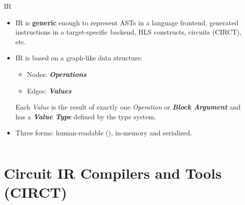\documentclass[8pt,a4paper,oneside,hidelinks,aspectratio=169,dvipsnames]{beamer}
\newcommand{\code}[1]{\texttt{\detokenize{#1}}}
\begin{document}
\begin{frame}{ IR}
  \begin{itemize}
    \item IR is \textbf{generic} enough to represent ASTs in a language frontend, generated instructions in a target-specific backend, HLS constructs, circuits (CIRCT), etc.
    \item IR is based on a graph-like data structure:
          \begin{itemize}
            \item Nodes: \textbf{\textit{Operations}}
            \item Edges: \textbf{\textit{Values}}
          \end{itemize}
          Each \textit{Value} is the result of exactly one \textit{Operation} or \textbf{\textit{Block Argument}} and has a \textbf{\textit{Value Type}} defined by the type system.
    \item Three forms: human-readable (\code{.mlir}), in-memory and serialized.
  \end{itemize}
  \begin{figure}[H]
    \centering
    \begin{minipage}{0.475\textwidth}
      \inputminted[tabsize=2,frame=single,rulecolor=gray,fontsize=\fontsize{6}{6}]{text}{fig/mlir_ir_example.mlir}
    \end{minipage}
  \end{figure}
\end{frame}

\section{Circuit IR Compilers and Tools (CIRCT)}
\end{document}
